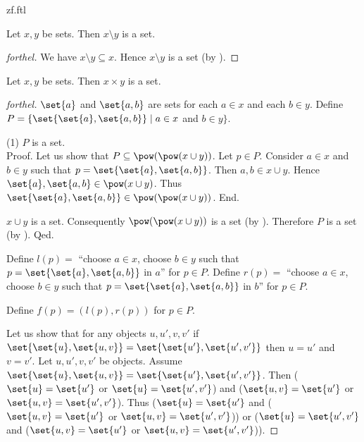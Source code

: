 \documentclass{naproche-library}
\begin{document}
\begin{smodule}{zf.ftl}
  \begin{proposition}[forthel,id=FOUNDATIONS_10_7795203882614784]
    Let $x, y$ be sets.
    Then $x \setminus y$ is a set.
  \end{proposition}
  \begin{proof}[forthel]
    We have $x \setminus y \subseteq x$.
    Hence $x \setminus y$ is a set (by ).
  \end{proof}

  \begin{proposition}[forthel,id=FOUNDATIONS_10_4458706448154624]
    Let $x, y$ be sets.
    Then $x \times y$ is a set.
  \end{proposition}
  \begin{proof}[forthel]
    $\set{a}$ and $\set{a,b}$ are sets for each $a \in x$ and each $b \in y$.
    Define $P = \{ \set{\set{a}, \set{a,b}} \mid a \in x$ and $b \in y \}$.

    (1) $P$ is a set. \\
    Proof.
      Let us show that $P \subseteq \pow(\pow(x \cup y))$.
        Let $p \in P$.
        Consider $a \in x$ and $b \in y$ such that $p = \set{\set{a},\set{a,b}}$.
        Then $a, b \in x \cup y$.
        Hence $\set{a}, \set{a,b} \in \pow(x \cup y)$.
        Thus $\set{\set{a}, \set{a,b}} \in \pow(\pow(x \cup y))$.
      End.

      $x \cup y$ is a set.
      Consequently $\pow(\pow(x \cup y))$ is a set (by ).
      Therefore $P$ is a set (by ).
    Qed.

    Define $l(p) =$ ``choose $a \in x$, choose $b \in y$ such that $p = \set{\set{a}, \set{a,b}}$ in $a$'' for $p \in P$.
    Define $r(p) =$ ``choose $a \in x$, choose $b \in y$ such that $p = \set{\set{a}, \set{a,b}}$ in $b$'' for $p \in P$.

    Define $f(p) = (l(p), r(p))$ for $p \in P$.

    Let us show that for any objects $u, u', v, v'$ if
    $\set{\set{u}, \set{u,v}} = \set{\set{u'}, \set{u',v'}}$ then $u = u'$ and $v = v'$.
      Let $u, u', v, v'$ be objects.
      Assume $\set{\set{u}, \set{u,v}} = \set{\set{u'}, \set{u',v'}}$.
      Then ($\set{u} = \set{u'}$ or $\set{u} = \set{u',v'}$) and ($\set{u,v} = \set{u'}$ or $\set{u,v} = \set{u',v'}$).
      Thus ($\set{u} = \set{u'}$ and ($\set{u,v} = \set{u'}$ or $\set{u,v} = \set{u',v'}$)) or ($\set{u} = \set{u',v'}$ and ($\set{u,v} = \set{u'}$ or $\set{u,v} = \set{u',v'}$)).


\end{proof}
\end{smodule}
\end{document}
